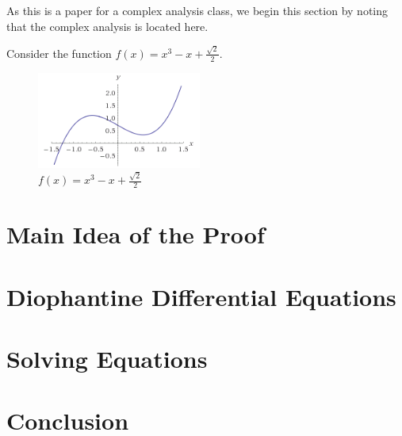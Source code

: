 \documentclass[twoside,letterpaper,10pt]{article}
\begin{document}
As this is a paper for a complex analysis class, we begin this section by noting
that the complex analysis is located here.

Consider the function $f(x) = x^3 - x + \frac{\sqrt{2}}{2}$.
\begin{figure}
  \begin{center}
    \includegraphics[width=0.48\textwidth]{newtonfail}
  \end{center}
  \caption{$f(x) = x^3 - x + \frac{\sqrt{2}}{2}$}
\end{figure}

\section{Main Idea of the Proof}
\label{sec:main-idea-proof}

\section{Diophantine Differential Equations}
\label{sec:dioph-diff-equat}

\section{Solving Equations}
\label{sec:solving-equations}

\section{Conclusion}
\label{sec:conclusion}
\end{document}
